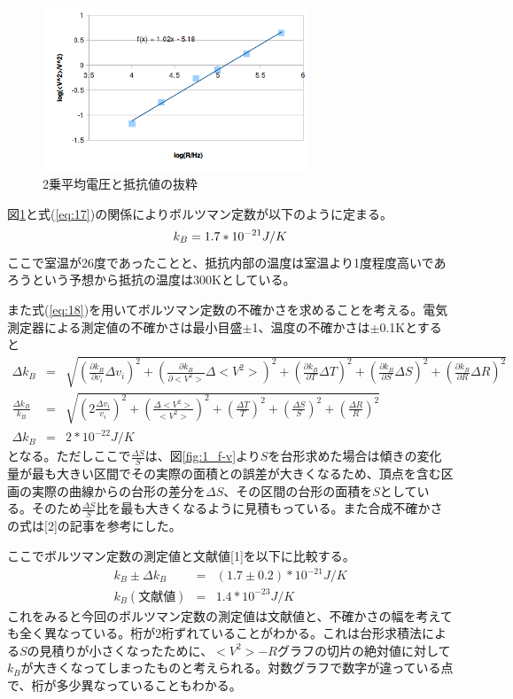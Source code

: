 \documentclass[11pt,a4j]{jsarticle}
\begin{document}
   \begin{figure}[htbp]
  \centering
  \includegraphics[width=8cm,clip]{2_after.png}
  \caption{2乗平均電圧と抵抗値の抜粋}
  \label{fig:2_after}
 \end{figure}%
   
   図\ref{fig:2_after}と式(\ref{eq:17})の関係によりボルツマン定数が以下のように定まる。
   \begin{equation}
   k_B = 1.7 * 10^{-21} J/K \nonumber \\
   \end{equation}
   ここで室温が26度であったことと、抵抗内部の温度は室温より1度程度高いであろうという予想から抵抗の温度は300Kとしている。
   
   また式(\ref{eq:18})を用いてボルツマン定数の不確かさを求めることを考える。電気測定器による測定値の不確かさは最小目盛$\pm$1、温度の不確かさは$\pm$0.1Kとすると
   \begin{eqnarray}
   \Delta k_B &=& \sqrt{(\frac{\partial k_B}{\partial v_i}\Delta v_i)^2 + (\frac{\partial k_B}{\partial <V^2>}\Delta <V^2>)^2 + (\frac{\partial k_B}{\partial T}\Delta T)^2 + (\frac{\partial k_B}{\partial S}\Delta S)^2 + (\frac{\partial k_B}{\partial R}\Delta R)^2} \nonumber \\
   \frac{\Delta k_B}{k_B} &=& \sqrt{(2\frac{\Delta v_i}{v_i})^2 + (\frac{\Delta <V^2>}{<V^2>})^2 + (\frac{\Delta T}{T})^2 + (\frac{\Delta S}{S})^2 + (\frac{\Delta R}{R})^2} \nonumber \\
   \Delta k_B &=& 2 * 10^{-22} J/K \nonumber
   \end{eqnarray}
   となる。ただしここで$\frac{\Delta S}{S}$は、図\ref{fig:1_f-v}より$S$を台形求めた場合は傾きの変化量が最も大きい区間でその実際の面積との誤差が大きくなるため、頂点を含む区画の実際の曲線からの台形の差分を$\Delta S$、その区間の台形の面積を$S$としている。そのため$\frac{\Delta S}{S}$比を最も大きくなるように見積もっている。また合成不確かさの式は[2]の記事を参考にした。
   
   ここでボルツマン定数の測定値と文献値[1]を以下に比較する。
   \begin{eqnarray}
   k_B \pm \Delta k_B &=& (1.7 \pm 0.2) * 10^{-21} J/K \nonumber \\
   k_B(文献値) &=& 1.4 * 10^{-23} J/K \nonumber
   \end{eqnarray}
   これをみると今回のボルツマン定数の測定値は文献値と、不確かさの幅を考えても全く異なっている。桁が2桁ずれていることがわかる。これは台形求積法による$S$の見積りが小さくなったために、$<V^2> - R$グラフの切片の絶対値に対して$k_B$が大きくなってしまったものと考えられる。対数グラフで数字が違っている点で、桁が多少異なっていることもわかる。
   
\end{document}
